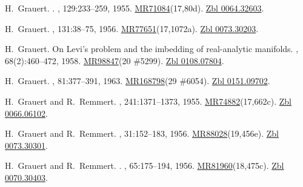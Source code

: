 \documentclass[11pt,a4paper, final, twoside]{article}
\numberwithin{equation}{section}
\begin{document}
\begin{appendices}
\begin{thebibliography}{100}
H.~Grauert.
.
, 129:233--259, 1955.
\newblock
  \href{http://www.ams.org/mathscinet-getitem?mr=71084}{MR71084}(17,80d).
  \href{http://zbmath.org/?q=an:0064.32603}{Zbl 0064.32603}.

H.~Grauert.
, 131:38--75, 1956.
\newblock
  \href{http://www.ams.org/mathscinet-getitem?mr=77651}{MR77651}(17,1072a).
  \href{http://zbmath.org/?q=an:0073.30203}{Zbl 0073.30203}.

H.~Grauert.
\newblock On {L}evi's problem and the imbedding of real-analytic manifolds.
, 68(2):460--472, 1958.
\newblock \href{http://www.ams.org/mathscinet-getitem?mr=98847}{MR98847}(20
  \#5299). \href{http://zbmath.org/?q=an:0108.07804}{Zbl 0108.07804}.

H.~Grauert.
, 81:377--391, 1963.
\newblock \href{http://www.ams.org/mathscinet-getitem?mr=168798}{MR168798}(29
  \#6054). \href{http://zbmath.org/?q=an:0151.09702}{Zbl 0151.09702}.

H.~Grauert and R.~Remmert.
, 241:1371--1373, 1955.
\newblock
  \href{http://www.ams.org/mathscinet-getitem?mr=74882}{MR74882}(17,662c).
  \href{http://zbmath.org/?q=an:0066.06102}{Zbl 0066.06102}.

H.~Grauert and R.~Remmert.
, 31:152--183, 1956.
\newblock
  \href{http://www.ams.org/mathscinet-getitem?mr=88028}{MR88028}(19,456e).
  \href{http://zbmath.org/?q=an:0073.30301}{Zbl 0073.30301}.

H.~Grauert and R.~Remmert.
.
, 65:175--194, 1956.
\newblock
  \href{http://www.ams.org/mathscinet-getitem?mr=81960}{MR81960}(18,475c).
  \href{http://zbmath.org/?q=an:0070.30403}{Zbl 0070.30403}.


\end{thebibliography}
\end{appendices}
\end{document}
